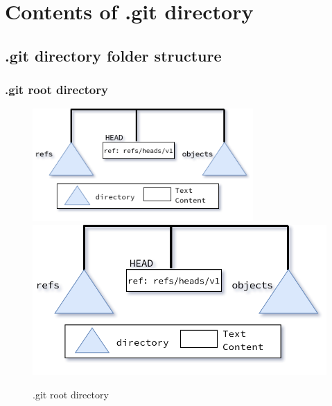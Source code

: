 \section{Contents of .git directory}
\subsection{.git directory folder structure}
\begin{frame}[fragile]
    \frametitle{.git root directory}
    \begin{figure}
        \begin{center}
            {
                \includegraphics[width=0.75\textwidth,keepaspectratio]{./images/gitDirectory-Root.png}
            }
            {
                \includegraphics[height=0.75\textheight,keepaspectratio]{./images/gitDirectory-Root.png}
            }
            \caption{.git root directory}
        \end{center}
    \end{figure}
\end{frame}


